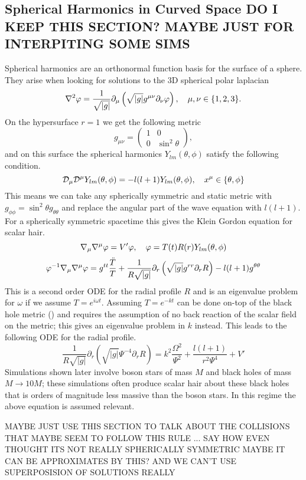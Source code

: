  \subsection{Spherical Harmonics in Curved Space DO I KEEP THIS SECTION? MAYBE JUST FOR INTERPITING SOME SIMS}
 Spherical harmonics are an orthonormal function basis for the surface of a sphere. They arise when looking for solutions to the 3D spherical polar laplacian
 \begin{equation} \nabla^2 \varphi= \frac{1}{\sqrt{|g|}}\partial_{\mu}\left( \sqrt{|g|}g^{\mu\nu}\partial_\nu \varphi\right), \quad \mu,\nu \in \{1,2,3\} .\end{equation}
 On the hypersurface $r=1$ we get the following metric
 \begin{equation} g_{\mu\nu} = \begin{pmatrix} 1 & 0 \\ 0 & \sin^2 \theta\end{pmatrix},\end{equation}
 and on this surface the spherical harmonics $Y_{lm}(\theta,\phi)$ satisfy the following condition.
 \begin{equation} \mathcal{D}_\mu \mathcal{D}^\mu Y_{lm}(\theta,\phi) = -l(l+1)Y_{lm}(\theta,\phi), \quad x^\mu \in \{\theta,\phi\}\end{equation} 
 This means we can take any spherically symmetric and static metric with $g_{\phi\phi} = \sin^2\theta g_{\theta\theta}$ and replace the angular part of the wave equation with $l(l+1)$. For a spherically symmetric spacetime this gives the Klein Gordon equation for scalar hair.
 \begin{equation} \nabla_\mu \nabla^\mu \varphi = V' \varphi, \quad \varphi = T(t)R(r)Y_{lm}(\theta,\phi)\end{equation}
 \begin{equation}\varphi^{-1}\nabla_\mu \nabla^\mu \varphi = g^{tt}\frac{\ddot{T}}{T} +  \frac{1}{R\sqrt{|g|}}\partial_{r}\left( \sqrt{|g|}g^{rr}\partial_r R\right) -{l(l+1)}g^{\theta\theta} \end{equation}
 This is a second order ODE for the radial profile $R$ and is an eigenvalue problem for $\omega$ if we assume $T=e^{i\omega t}$. Assuming $T=e^{-kt}$ can be done on-top of the black hole metric () and requires the assumption of no back reaction of the scalar field on the metric; this gives an eigenvalue problem in $k$ instead. This leads to the following ODE for the radial profile. 
 \begin{equation} \frac{1}{R\sqrt{|g|}}\partial_{r}\left( \sqrt{|g|}\Psi^{-4}\partial_r R\right)  = k^2 \frac{\Omega^2}{\Psi^2} + \frac{l(l+1)}{r^2 \Psi^4} + V'\end{equation}
Simulations shown later involve boson stars of mass $M$ and black holes of mass $M\rightarrow 10M$; these simulations often produce scalar hair about these black holes that is orders of magnitude less massive than the boson stars. In this regime the above equation is assumed relevant.


MAYBE JUST USE THIS SECTION TO TALK ABOUT THE COLLISIONS THAT MAYBE SEEM TO FOLLOW THIS RULE ... SAY HOW EVEN THOUGHT ITS NOT REALLY SPHERICALLY SYMMETRIC MAYBE IT CAN BE APPROXIMATES BY THIS? AND WE CAN'T USE SUPERPOSISION OF SOLUTIONS REALLY 













